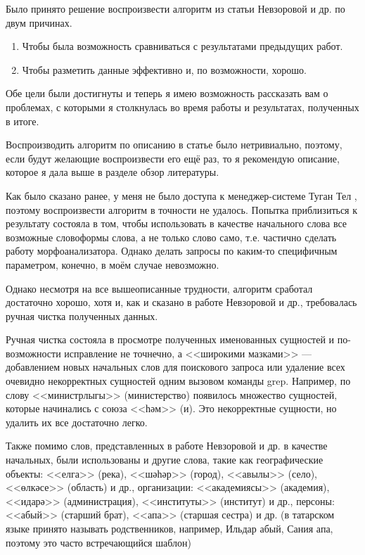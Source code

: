 Было принято решение воспроизвести алгоритм из статьи Невзоровой и др. \cite{Nevzorova} по двум причинах.

\begin{enumerate}
\item Чтобы была возможность сравниваться с результатами предыдущих работ.
\item Чтобы разметить данные эффективно и, по возможности, хорошо.
\end{enumerate}

Обе цели были достигнуты и теперь я имею возможность рассказать вам о проблемах, с которыми я столкнулась во время работы и результатах, полученных в итоге.

Воспроизводить алгоритм по описанию в статье было нетривиально, поэтому, если будут желающие воспроизвести его ещё раз, то я рекомендую описание, которое я дала выше в разделе обзор литературы.

Как было сказано ранее, у меня не было доступа к менеджер-системе Туган Тел \cite{tugan_tel}, поэтому воспроизвести алгоритм в точности не удалось. Попытка приблизиться к результату состояла в том, чтобы использовать в качестве начального слова все возможные словоформы слова, а не только слово само, т.е. частично сделать работу морфоанализатора. Однако делать запросы по каким-то специфичным параметром, конечно, в моём случае невозможно.

Однако несмотря на все вышеописанные трудности, алгоритм сработал достаточно хорошо, хотя и, как и сказано в работе Невзоровой и др., требовалась ручная чистка полученных данных.

Ручная чистка состояла в просмотре полученных именованных сущностей и по-возможности исправление не точнечно, а <<широкими мазками>> --- добавлением новых начальных слов для поискового запроса или удаление всех очевидно некорректных сущностей одним вызовом команды grep. Например, по слову <<министрлыгы>> (министерство) появилось множество сущностей, которые начинались с союза <<һәм>> (и). Это некорректные сущности, но удалить их все достаточно легко. 

Также помимо слов, представленных в работе Невзоровой и др. в качестве начальных, были использованы и другие слова, такие как географические объекты: <<елга>> (река), <<шәһәр>> (город), <<авылы>> (село), <<өлкәсе>> (область) и др., организации:  <<академиясы>> (академия), <<идарә>> (администрация), <<институты>> (институт) и др., персоны: <<абый>> (старший брат), <<апа>> (старшая сестра) и др. (в татарском языке принято называть родственников, например, Ильдар абый, Сания апа, поэтому это часто встречающийся шаблон) 

